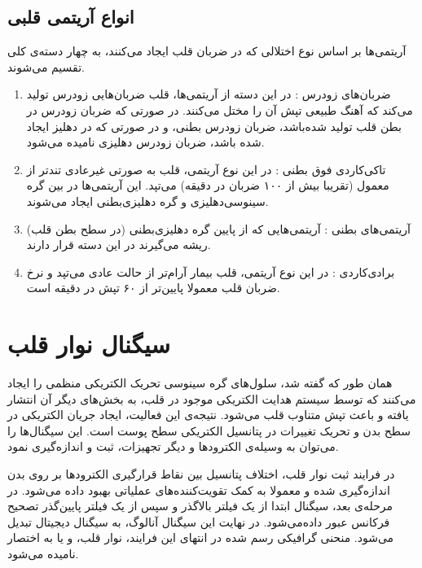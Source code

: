 \subsection{انواع آریتمی قلبی}
آریتمی‌ها بر اساس نوع اختلالی که در ضربان قلب ایجاد می‌کنند، به چهار دسته‌ی کلی تقسیم می‌شوند.
\begin{enumerate}
	\item ضربان‌های زودرس : در این دسته از آریتمی‌ها، قلب ضربا‌ن‌هایی زودرس تولید می‌کند که آهنگ طبیعی تپش آن را مختل می‌کنند. در صورتی که ضربان زودرس در بطن قلب تولید شده‌باشد، ضربان زودرس بطنی، و در صورتی که در دهلیز ایجاد شده باشد، ضربان زودرس دهلیزی  نامیده می‌شود.
	\item تاکی‌کاردی فوق بطنی : در این نوع آریتمی، قلب به صورتی غیرعادی تندتر از معمول  (تقریبا بیش از ۱۰۰ ضربان در دقیقه) می‌تپد. \cite{Amboss} این آریتمی‌ها در بین گره سینوسی‌دهلیزی و گره دهلیزی‌بطنی ایجاد می‌شوند. 
	\item آریتمی‌های بطنی :  آریتمی‌هایی که از پایین گره دهلیزی‌بطنی (در سطح بطن قلب) ریشه می‌گیرند در این دسته قرار دارند.
	\item برادی‌کاردی : در این نوع آریتمی، قلب بیمار آرام‌تر از حالت عادی می‌تپد و نرخ ضربان قلب معمولا پایین‌تر از ۶۰ تپش در دقیقه است.  \cite{Verywellhealth}

\end{enumerate}

\section{سیگنال نوار قلب}
همان طور که گفته شد، سلول‌های گره سینوسی تحریک الکتریکی منظمی را ایجاد می‌کنند که توسط سیستم هدایت الکتریکی موجود در قلب، به بخش‌های دیگر آن انتشار یافته و باعث تپش متناوب قلب می‌شود. نتیجه‌ی این فعالیت، ایجاد جریان الکتریکی در سطح بدن و تحریک تغییرات در پتانسیل الکتریکی سطح پوست است. این سیگنال‌ها را می‌توان به وسیله‌ی الکترودها و دیگر تجهیزات، ثبت و اندازه‌گیری نمود.

در فرایند ثبت نوار قلب، اختلاف پتانسیل بین نقاط قرارگیری الکترودها بر روی بدن اندازه‌گیری شده و معمولا به کمک تقویت‌کننده‌های عملیاتی  بهبود داده می‌شود. در مرحله‌ی بعد، سیگنال ابتدا از یک فیلتر بالاگذر و سپس از یک فیلتر پایین‌گذر تصحیح فرکانس عبور داده‌می‌شود. در نهایت این سیگنال آنالوگ، به سیگنال دیجیتال تبدیل می‌شود. منحنی گرافیکی رسم شده در انتهای این فرایند، نوار قلب، و یا به اختصار  نامیده می‌شود. 

